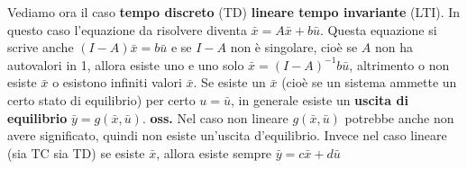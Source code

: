 \newline
Vediamo ora il caso \textbf{tempo discreto} (TD) \textbf{lineare tempo invariante} (LTI). In questo caso l'equazione da risolvere diventa $\bar{x} = A \bar{x} + b \bar{u}$. Questa equazione si scrive anche $(I-A)\bar{x} = b \bar{u}$ e se $I-A$ non è singolare, cioè se $A$ non ha autovalori in 1, allora esiste uno e uno solo $\bar{x} = (I-A)^{-1} b \bar{u}$, altrimento o non esiste $\bar{x}$ o esistono infiniti valori $\bar{x}$.\newline
\newline
Se esiste un $\bar{x}$ (cioè se un sistema ammette un certo stato di equilibrio) per certo $u = \bar{u}$, in generale esiste un \textbf{uscita di equilibrio} $\bar{y} = g(\bar{x}, \bar{u})$.\newline
\newline
\textbf{oss.} Nel caso non lineare $g(\bar{x}, \bar{u})$ potrebbe anche non avere significato, quindi non esiste un'uscita d'equilibrio. Invece nel caso lineare (sia TC sia TD) se esiste $\bar{x}$, allora esiste sempre $\bar{y} = c \bar{x} + d \bar{u}$
